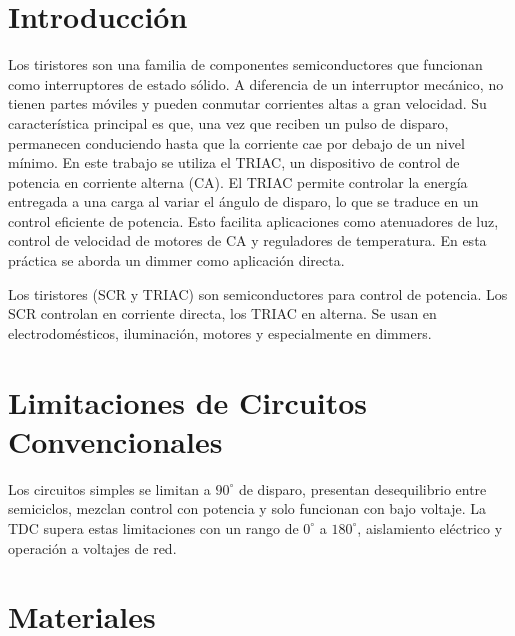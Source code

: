 \documentclass[12pt,a4paper]{article}
\begin{document}
\section{Introducción}
Los tiristores son una familia de componentes semiconductores que funcionan como interruptores de estado sólido. A diferencia de un interruptor mecánico, no tienen partes móviles y pueden conmutar corrientes altas a gran velocidad. Su característica principal es que, una vez que reciben un pulso de disparo, permanecen conduciendo hasta que la corriente cae por debajo de un nivel mínimo. En este trabajo se utiliza el TRIAC, un dispositivo de control de potencia en corriente alterna (CA). El TRIAC permite controlar la energía entregada a una carga al variar el ángulo de disparo, lo que se traduce en un control eficiente de potencia. Esto facilita aplicaciones como atenuadores de luz, control de velocidad de motores de CA y reguladores de temperatura. En esta práctica se aborda un dimmer como aplicación directa.

Los tiristores (SCR y TRIAC) son semiconductores para control de potencia. Los SCR controlan en corriente directa, los TRIAC en alterna. Se usan en electrodomésticos, iluminación, motores y especialmente en dimmers.

\section{Limitaciones de Circuitos Convencionales}

Los circuitos simples se limitan a $90^{\circ}$ de disparo, presentan desequilibrio entre semiciclos, mezclan control con potencia y solo funcionan con bajo voltaje. La TDC supera estas limitaciones con un rango de $0^{\circ}$ a $180^{\circ}$, aislamiento eléctrico y operación a voltajes de red.

\section{Materiales}
\end{document}
